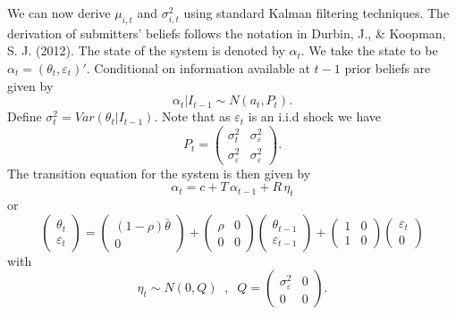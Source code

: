 \documentclass[a4,12pt]{article}
\begin{document}
We can now derive $\mu_{i,t}$ and $\sigma_{i,t}^2$ using standard Kalman filtering techniques. The derivation of submitters' beliefs follows the notation in Durbin, J., \& Koopman, S. J. (2012). The state of the system is denoted by $\alpha_t$. We take the state to be $\alpha_t = (\theta_t, \varepsilon_t)'$. Conditional on information available at $t-1$ prior beliefs are given by
\[ \alpha_t | I_{t-1} \sim N(a_t, P_t).\]
Define $\sigma^2_t = Var(\theta_t | I_{t-1})$. Note that as $\varepsilon_t$ is an i.i.d shock we have
\begin{equation*}
P_t =
\left(
\begin{array}{cc}
\sigma^2_{t} & \sigma_\varepsilon^2\\
\sigma_\varepsilon^2 & \sigma_\varepsilon^2
\end{array}
\right).
\end{equation*}
The transition equation for the system is then given by
\begin{equation}
\alpha_{t} = c + T \, \alpha_{t-1} + R \, \eta_t
\end{equation}
or 
\begin{equation*}
\left(
\begin{array}{c}
\theta_t\\
\varepsilon_t
\end{array}
\right)
=
\left(
\begin{array}{c}
(1-\rho) \bar{\theta}\\
0
\end{array}
\right)
+
\left(
\begin{array}{cc}
\rho & 0\\
0 & 0
\end{array}
\right)
\left(
\begin{array}{c}
\theta_{t-1}\\
\varepsilon_{t-1}
\end{array}
\right)
+
\left(
\begin{array}{cc}
1 & 0\\
1 & 0
\end{array}
\right)
\left(
\begin{array}{c}
\varepsilon_t\\
0
\end{array}
\right)
\end{equation*}
with
\begin{equation*}
\eta_t \sim N(0, Q) \; \; , \; \;
Q =
\left(
\begin{array}{cc}
\sigma_{\varepsilon}^2 & 0\\
0 & 0
\end{array}
\right).
\end{equation*}
\end{document}
